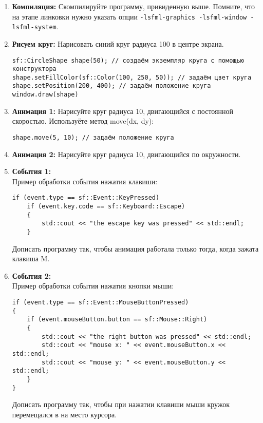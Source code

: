 \documentclass{article}
\begin{document}
\begin{enumerate}
\item \textbf{Компиляция:} Скомпилируйте программу, привиденную выше. Помните, что на этапе линковки нужно указать опции \texttt{-lsfml-graphics -lsfml-window -lsfml-system}.
\item \textbf{Рисуем круг:} Нарисовать синий круг радиуса 100 в центре экрана.
\begin{lstlisting}
sf::CircleShape shape(50); // создаём экземпляр круга с помощью конструктора
shape.setFillColor(sf::Color(100, 250, 50)); // задаём цвет круга
shape.setPosition(200, 400); // задаём положение круга
window.draw(shape)
\end{lstlisting}
\newpage
\item \textbf{Анимация 1:} Нарисуйте круг радиуса 10, двигающийся с постоянной скоростью. Используёте метод move(dx, dy):
\begin{lstlisting}
shape.move(5, 10); // задаём положение круга
\end{lstlisting}
\item \textbf{Анимация 2:} Нарисуйте круг радиуса 10, двигающийся по окружности.
\item \textbf{События 1:} \\
Пример обработки события нажатия клавиши:
\begin{lstlisting}
if (event.type == sf::Event::KeyPressed)
    if (event.key.code == sf::Keyboard::Escape)
    {
        std::cout << "the escape key was pressed" << std::endl;
    }
\end{lstlisting}
Дописать программу так, чтобы анимация работала только тогда, когда зажата клавиша M.

\item \textbf{События 2:} \\
Пример обработки события нажатия кнопки мыши:
\begin{lstlisting}
if (event.type == sf::Event::MouseButtonPressed)
{
    if (event.mouseButton.button == sf::Mouse::Right)
    {
        std::cout << "the right button was pressed" << std::endl;
        std::cout << "mouse x: " << event.mouseButton.x << std::endl;
        std::cout << "mouse y: " << event.mouseButton.y << std::endl;
    }
}
\end{lstlisting}
Дописать программу так, чтобы при нажатии клавиши мыши кружок перемещался в на место курсора.


\end{enumerate}
\end{document}
